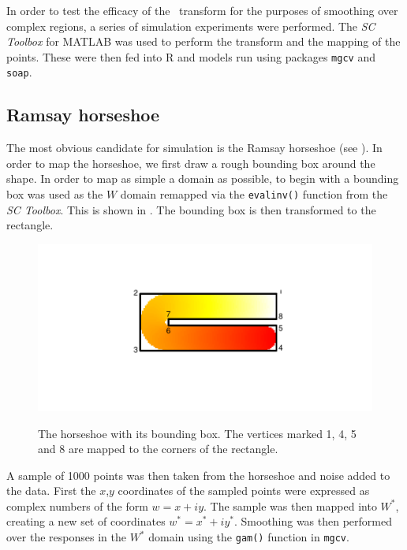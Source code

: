 In order to test the efficacy of the \sch\ transform for the purposes of smoothing over complex regions, a series of simulation experiments were performed. The \emph{SC Toolbox} for MATLAB was used to perform the transform and the mapping of the points. These were then fed into \textsf{R} and models run using packages \texttt{mgcv} and \texttt{soap}.

\subsection{Ramsay horseshoe}

The most obvious candidate for simulation is the Ramsay horseshoe (see ). In order to map the horseshoe, we first draw a rough bounding box around the shape. In order to map as simple a domain as possible, to begin with a bounding box was used as the $W$ domain remapped via the \texttt{evalinv()} function from the \emph{SC Toolbox}. This is shown in . The bounding box is then transformed to the rectangle. 

\begin{figure}
\centering
\includegraphics[trim=0.5in 1in 0in 0.5in]{sc/figs/hswithboundingbox.pdf} \\
\caption{The horseshoe with its bounding box. The vertices marked 1, 4, 5 and 8 are mapped to the corners of the rectangle.}
\label{hswithboundingbox}
\end{figure}

A sample of 1000 points was then taken from the horseshoe and noise added to the data. First the $x$,$y$ coordinates of the sampled points were expressed as complex numbers of the form $w=x+iy$. The sample was then mapped into $W^*$, creating a new set of coordinates $w^*=x^*+iy^*$. Smoothing was then performed over the responses in the $W^*$ domain using the \texttt{gam()} function in \texttt{mgcv}. 

